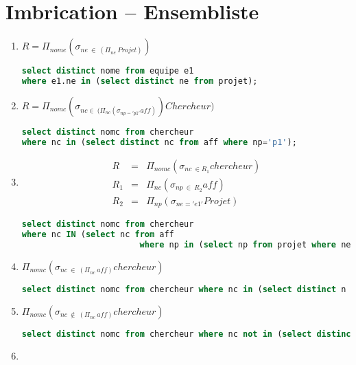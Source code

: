 	\chapter{Imbrication -- Ensembliste}
	\begin{enumerate}
		\item 
				$R = \Pi_{nome} (\sigma_{ne\ \in\ (\Pi_{ne}\ Projet)})$\\
	\begin{lstlisting}[language=SQL, numbers=none]
select distinct nome from equipe e1 
where e1.ne in (select distinct ne from projet); 
	\end{lstlisting}

\item 
	$ R = \Pi_{nomc}(\sigma_{nc \in\ (\Pi_{nc}(\sigma_{np = 'p1'}aff)})Chercheur)$
	\begin{lstlisting}[language=SQL, numbers=none]
select distinct nomc from chercheur
where nc in (select distinct nc from aff where np='p1');
	\end{lstlisting}
\item 
	\begin{eqnarray*}
	R &=& \Pi_{nomc}(\sigma_{nc\ \in R_1} chercheur)\\
	R_1 &=& \Pi_{nc}(\sigma_{np\ \in\ R_2} aff)\\
	R_2 &=& \Pi_{np}(\sigma_{ne = 'e1'} Projet)
	\end{eqnarray*}
	\begin{lstlisting}[language=SQL, numbers=none]
select distinct nomc from chercheur 
where nc IN (select nc from aff 
						where np in (select np from projet where ne = 'e1'));
	\end{lstlisting}
\item 
	$\Pi_{nomc} (\sigma_{nc\ \in\ (\Pi_{nc}\ aff)} chercheur)$
	\begin{lstlisting}[language=SQL, numbers=none]
select distinct nomc from chercheur where nc in (select distinct n from aff);
	\end{lstlisting}
\item 
	$\Pi_{nomc} (\sigma_{nc\ \notin\ (\Pi_{nc}\ aff)} chercheur)$
	\begin{lstlisting}[language=SQL, numbers=none]
select distinct nomc from chercheur where nc not in (select distinct n from aff);
	\end{lstlisting}
\item ~ 
\end{enumerate}
